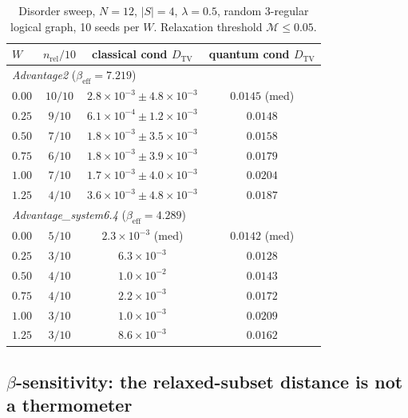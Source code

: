 \documentclass[aps,prapplied,reprint,superscriptaddress,floatfix,nofootinbib]{revtex4-2}
\begin{document}
\begin{table}[!htbp]
\centering
\caption{Disorder sweep, $N=12$, $|S|=4$, $\lambda=0.5$,
random 3-regular logical graph, 10 seeds per $W$.  Relaxation
threshold $\mathcal{M}\le0.05$.}
\label{tab:phase6_phase3c}
\begin{tabular}{lccc}
\toprule
$W$ & $n_{\mathrm{rel}}/10$ & classical cond $D_\mathrm{TV}$ & quantum cond $D_\mathrm{TV}$ \\
\midrule
\multicolumn{4}{l}{\emph{Advantage2} ($\beta_\mathrm{eff}=7.219$)} \\
\midrule
$0.00$  & $10/10$ & $2.8\!\times\!10^{-3}\pm 4.8\!\times\!10^{-3}$ & $0.0145$ (med) \\
$0.25$  & $9/10$  & $6.1\!\times\!10^{-4}\pm 1.2\!\times\!10^{-3}$ & $0.0148$ \\
$0.50$  & $7/10$  & $1.8\!\times\!10^{-3}\pm 3.5\!\times\!10^{-3}$ & $0.0158$ \\
$0.75$  & $6/10$  & $1.8\!\times\!10^{-3}\pm 3.9\!\times\!10^{-3}$ & $0.0179$ \\
$1.00$  & $7/10$  & $1.7\!\times\!10^{-3}\pm 4.0\!\times\!10^{-3}$ & $0.0204$ \\
$1.25$  & $4/10$  & $3.6\!\times\!10^{-3}\pm 4.8\!\times\!10^{-3}$ & $0.0187$ \\
\midrule
\multicolumn{4}{l}{\emph{Advantage\_system6.4} ($\beta_\mathrm{eff}=4.289$)} \\
\midrule
$0.00$  & $5/10$  & $2.3\!\times\!10^{-3}$ (med)  & $0.0142$ (med) \\
$0.25$  & $3/10$  & $6.3\!\times\!10^{-3}$        & $0.0128$ \\
$0.50$  & $4/10$  & $1.0\!\times\!10^{-2}$        & $0.0143$ \\
$0.75$  & $4/10$  & $2.2\!\times\!10^{-3}$        & $0.0172$ \\
$1.00$  & $3/10$  & $1.0\!\times\!10^{-3}$        & $0.0209$ \\
$1.25$  & $3/10$  & $8.6\!\times\!10^{-3}$        & $0.0162$ \\
\bottomrule
\end{tabular}
\end{table}

\subsection{$\beta$-sensitivity: the relaxed-subset distance is not a thermometer}
\label{sec:phase6_beta_sensitivity}
\end{document}
